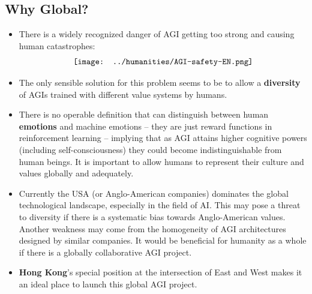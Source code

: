 \begin{preview}
\begin{minipage}{\textwidth}
\setlength{\parskip}{0.4\baselineskip}
		
\section{Why Global?}

\begin{itemize}
	\item There is a widely recognized danger of AGI getting too strong and causing human catastrophes:
	\begin{equation}
	\nonumber
	\vcenter{\hbox{\texttt{[image: ../humanities/AGI-safety-EN.png]}}}
	\end{equation}

	\item The only sensible solution for this problem seems to be to allow a \textbf{diversity} of AGIs trained with different value systems by humans.

	\item There is no operable definition that can distinguish between human \textbf{emotions} and machine emotions -- they are just reward functions in reinforcement learning -- implying that as AGI attains higher cognitive powers (including self-consciousness) they could become indistinguishable from human beings.  It is important to allow humans to represent their culture and values globally and adequately.

	\item Currently the USA (or Anglo-American companies) dominates the global technological landscape, especially in the field of AI.  This may pose a threat to diversity if there is a systematic bias towards Anglo-American values.  Another weakness may come from the homogeneity of AGI architectures designed by similar companies.  It would be beneficial for humanity as a whole if there is a globally collaborative AGI project.

	\item \textbf{Hong Kong}'s special position at the intersection of East and West makes it an ideal place to launch this global AGI project.

\end{itemize}

\end{minipage}
\end{preview}


